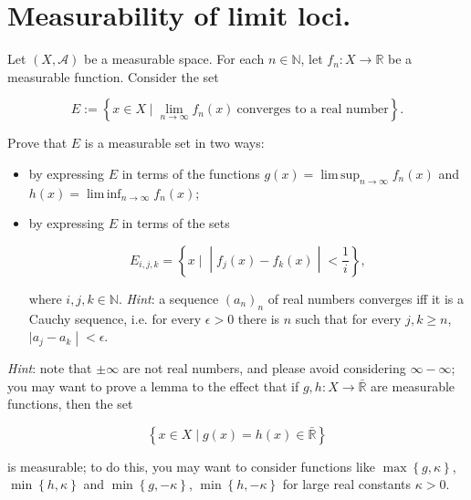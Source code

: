 \documentclass{qlnotes-export}
\begin{document}
\section{Measurability of limit loci.}

Let \((X,\mathcal{A})\) be a measurable space. For each \(n \in {\mathbb{N}}\), let \(f_{n}:X\rightarrow{\mathbb{R}}\) be a measurable function. Consider the set

\[E := \left\{ {x \in X \mid \lim\limits_{n\rightarrow\infty}f_{n}(x)\ \text{converges to a real number}} \right\}.\]

Prove that \(E\) is a measurable set in two ways:

\begin{itemize}
\item
  by expressing \(E\) in terms of the functions \(g(x) = \operatorname{lim\, sup}_{n\rightarrow\infty}f_{n}(x)\) and \(h(x) = \operatorname{lim\, inf}_{n\rightarrow\infty}f_{n}(x)\);
\item
  by expressing \(E\) in terms of the sets

  \[E_{i,j,k} = \left\{ x \mid \middle| f_{j}(x) - f_{k}(x) \middle| < \frac{1}{i} \right\},\]

  where \(i,j,k \in {\mathbb{N}}\). \emph{Hint}: a sequence \((a_{n})_{n}\) of real numbers converges iff it is a Cauchy sequence, i.e. for every \(\epsilon > 0\) there is \(n\) such that for every \(j,k \geq n\), \(\left. |a_{j} - a_{k} \middle| < \epsilon \right.\).
\end{itemize}

\emph{Hint}: note that \(\pm \infty\) are not real numbers, and please avoid considering \(\infty - \infty\); you may want to prove a lemma to the effect that if \(g,h:X\rightarrow\bar{\mathbb{R}}\) are measurable functions, then the set

\[\left\{ {x \in X \mid g(x) = h(x) \in \bar{\mathbb{R}}} \right\}\]

is measurable; to do this, you may want to consider functions like \(\max\left\{ {g,\kappa} \right\}\), \(\min\left\{ {h,\kappa} \right\}\) and \(\min\left\{ {g, - \kappa} \right\}\), \(\min\left\{ {h, - \kappa} \right\}\) for large real constants \(\kappa > 0\).
\end{document}
